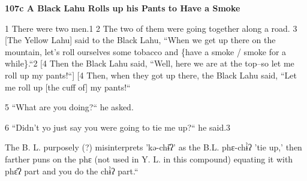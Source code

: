 
\textbf{107c A Black Lahu Rolls up his Pants to Have a Smoke }

1 There were two men.1 2 The two of them were going together along a road. 3 [The
Yellow Lahu] said to the Black Lahu, ``When we get up there on the mountain,
let's roll ourselves some tobacco and \{have a smoke / smoke for a while\}.``2
[4 Then the Black Lahu said, ``Well, here we are at the top--so let me
roll up my pants!``] [4 Then, when they got up there, the Black Lahu said,
``Let me roll up [the cuff of] my pants!``

5 ``What are you doing?`` he asked.

6 ``Didn't yo just say you were going to tie me up?`` he said.3

The B. L. purposely (?) misinterprets 'kə-chɨ̂ʔ' as the B.L. phɛ-chɨ̀ʔ
'tie up,' then farther puns on the phɛ (not used in Y. L. in this compound) equating
it with phɛ̂ʔ part and you do the chɨ̀ʔ part.``

